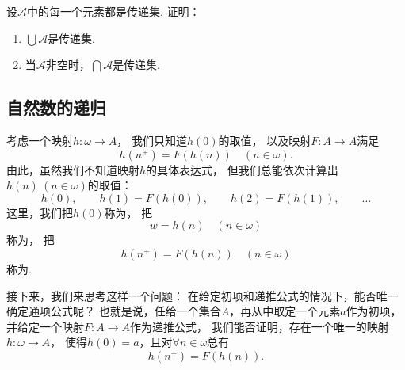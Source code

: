 \begin{example}
\def\A{\mathscr{A}}%
设\(\A\)中的每一个元素都是传递集.
证明：\begin{enumerate}
	\item \(\bigcup \A\)是传递集.
	\item 当\(\A\)非空时，\(\bigcap \A\)是传递集.
\end{enumerate}
%
\end{example}

\subsection{自然数的递归}
考虑一个映射\(h\colon \omega \to A\)，
我们只知道\(h(0)\)的取值，
以及映射\(F\colon A \to A\)满足\[
	h(n^+) = F(h(n))
	\quad(n\in\omega).
\]
由此，虽然我们不知道映射\(h\)的具体表达式，
但我们总能依次计算出\(h(n)\ (n\in\omega)\)的取值：\[
	h(0), \qquad
	h(1) = F(h(0)), \qquad
	h(2) = F(h(1)), \qquad
	\dotsc
\]
这里，我们把\(h(0)\)称为，
把\[
	w = h(n) \quad(n\in\omega)
\]称为，
把\[
	h(n^+) = F(h(n)) \quad(n\in\omega)
\]称为.

接下来，我们来思考这样一个问题：
在给定初项和递推公式的情况下，能否唯一确定通项公式呢？
也就是说，任给一个集合\(A\)，再从中取定一个元素\(a\)作为初项，
并给定一个映射\(F\colon A \to A\)作为递推公式，
我们能否证明，存在一个唯一的映射\(h\colon \omega \to A\)，
使得\(h(0) = a\)，且对\(\forall n\in\omega\)总有\[
	h(n^+) = F(h(n)).
\]

